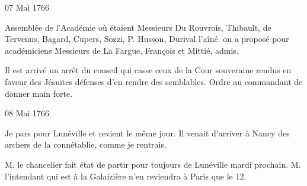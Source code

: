                      \begin{diary}{07 Mai 1766}{}
                        
                         Assemblée de l'Académie où étaient Messieurs
                           Du Rouvrois, Thibault, de
                              Tervenus, Bagard,
                           Cupers, Sozzi, P. Husson,
                              Durival l'aîné.
                           on a proposé pour académiciens Messieurs
                           de La
                              Fargue, François et Mittié,
                           admis. \bigskip
        
        
                         Il est arrivé un arrêt du conseil qui casse
                           ceux de la Cour souveraine rendus en faveur des
                              Jésuites
                           défenses d'en rendre des semblables. Ordre au
                           commandant de donner main forte. \bigskip
        
        
                     \end{diary}

                     \begin{diary}{08 Mai 1766}{}
                        
                         Je pars pour Lunéville et revient le même
                           jour. Il venait d'arriver à Nancy des
                           archers de la connétablie,
                           comme je rentrais. \bigskip
        
        
                        
                           M. le chancelier fait état de partir pour toujours
                           de Lunéville mardi
                           prochain. M. l'intendant
                           qui est à la
                              Galaizière n'en reviendra à
                           Paris que le 12. \bigskip
        
        
                     \end{diary}

